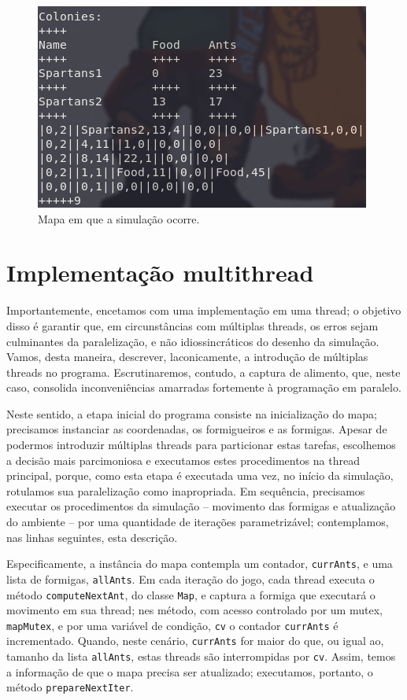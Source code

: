 \documentclass[12pt]{article}
\theoremstyle{definition}
\begin{document}
\begin{figure} 
	\centering 
	\includegraphics[width = \textwidth]{map.png} 
	\caption{Mapa em que a simulação ocorre.} 
	\label{fig:map} 
\end{figure} 

\section{Implementação multithread} 

Importantemente, encetamos com uma implementação em uma thread; o objetivo disso é garantir que, em circunstâncias com múltiplas threads, os erros sejam culminantes da paralelização, e não idiossincráticos do desenho da simulação. Vamos, desta maneira, descrever, laconicamente, a introdução de múltiplas threads no programa. Escrutinaremos, contudo, a captura de alimento, que, neste caso, consolida inconveniências amarradas fortemente à programação em paralelo. 

Neste sentido, a etapa inicial do programa consiste na inicialização do mapa; precisamos instanciar as coordenadas, os formigueiros e as formigas. Apesar de podermos introduzir múltiplas threads para particionar estas tarefas, escolhemos a decisão mais parcimoniosa e executamos estes procedimentos na thread principal, porque, como esta etapa é executada uma vez, no início da simulação, rotulamos sua paralelização como inapropriada. Em sequência, precisamos executar os procedimentos da simulação -- movimento das formigas e atualização do ambiente -- por uma quantidade de iterações parametrizável; contemplamos, nas linhas seguintes, esta descrição. 

Especificamente, a instância do mapa contempla um contador, \texttt{currAnts}, e uma lista de formigas, \texttt{allAnts}. Em cada iteração do jogo, cada thread executa o método \texttt{computeNextAnt}, do classe \texttt{Map}, e captura a formiga que executará o movimento em sua thread; nes método, com acesso controlado por um mutex, \texttt{mapMutex}, e por uma variável de condição, \texttt{cv} o contador \texttt{currAnts} é incrementado. Quando, neste cenário, \texttt{currAnts} for maior do que, ou igual ao, tamanho da lista \texttt{allAnts}, estas threads são interrompidas por \texttt{cv}. Assim, temos a informação de que o mapa precisa ser atualizado; executamos, portanto, o método \texttt{prepareNextIter}. 
\end{document}
